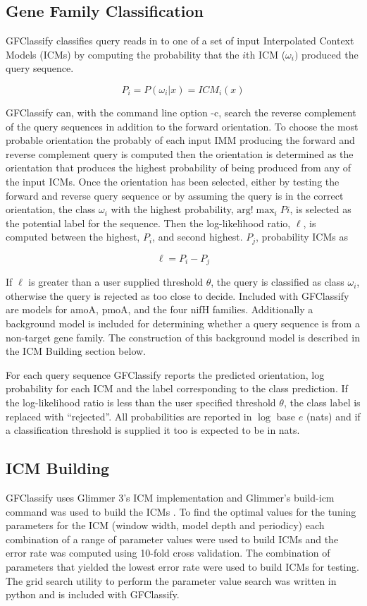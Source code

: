 \documentclass{article}
\begin{document}
\subsection{Gene Family Classification}
GFClassify classifies query reads in to one of a set of input Interpolated Context Models (ICMs) by computing the probability that the $i$th ICM ($\omega_i)$ produced the query sequence.

\[ P_i = P(\omega_i|x) = ICM_i(x) \]

GFClassify can, with the command line option -c, search the reverse complement of the query sequences in addition to the forward orientation.  To choose the most probable orientation the probably of each input IMM producing the forward and reverse complement query is computed then the orientation is determined as the orientation that produces the highest probability of being produced from any of the input ICMs.  Once the orientation has been selected, either by testing the forward and reverse query sequence or by assuming the query is in the correct orientation, the class $\omega_i$ with the highest probability, $\mbox{arg}!\max_i Pi$, is selected as the potential label for the sequence. Then the log-likelihood ratio, $\ell$, is computed between the highest, $P_i$, and second highest. $P_j$, probability ICMs as

\[ \ell = P_i - P_j \]

If $\ell$ is greater than a user supplied threshold $\theta$,  the query is classified as class $\omega_i$, otherwise the query is rejected as too close to decide.  Included with GFClassify are models for amoA, pmoA, and the four nifH families.  Additionally a background model is included for determining whether a query sequence is from a non-target gene family.  The construction of this background model is described in the ICM Building section below.

For each query sequence GFClassify reports the predicted orientation, log probability for each ICM and the label corresponding to the class prediction. If the log-likelihood ratio is less than the user specified threshold $\theta$, the class label is replaced with ``rejected''.  All probabilities are reported in $\log$ base $e$ (nats) and if a classification threshold is supplied it too is expected to be in nats.

\subsection{ICM Building}
GFClassify uses Glimmer 3's ICM implementation and Glimmer's build-icm command was used to build the ICMs \cite{Glimmer3}.  To find the optimal values for the tuning parameters for the ICM (window width, model depth and periodicy) each combination of a range of parameter values were used to build ICMs and the error rate was computed using 10-fold cross validation.  The combination of parameters that yielded the lowest error rate were used to build ICMs for testing.  The grid search utility to perform the parameter value search was written in python and is included with GFClassify.
\end{document}
